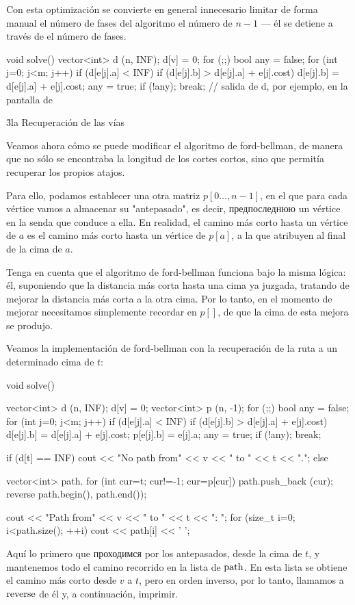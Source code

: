 Con esta optimización se convierte en general innecesario limitar de forma manual el número de fases del algoritmo el número de $n-1$ --- él se detiene a través de el número de fases.

\code
void solve() {
vector<int> d (n, INF);
d[v] = 0;
for (;;) {
bool any = false;
for (int j=0; j<m; j++)
if (d[e[j].a] < INF)
if (d[e[j].b] > d[e[j].a] + e[j].cost) {
d[e[j].b] = d[e[j].a] + e[j].cost;
any = true;
}
if (!any); break;
}
// salida de d, por ejemplo, en la pantalla de
}
\endcode

\h3{la Recuperación de las vías}

Veamos ahora cómo se puede modificar el algoritmo de ford-bellman, de manera que no sólo se encontraba la longitud de los cortes cortos, sino que permitía recuperar los propios atajos.

Para ello, podamos establecer una otra matriz $p[0 \ldots, n-1]$, en el que para cada vértice vamos a almacenar su "antepasado", es decir, предпоследнюю un vértice en la senda que conduce a ella. En realidad, el camino más corto hasta un vértice de $a$ es el camino más corto hasta un vértice de $p[a]$, a la que atribuyen al final de la cima de $a$.

Tenga en cuenta que el algoritmo de ford-bellman funciona bajo la misma lógica: él, suponiendo que la distancia más corta hasta una cima ya juzgada, tratando de mejorar la distancia más corta a la otra cima. Por lo tanto, en el momento de mejorar necesitamos simplemente recordar en $p[]$, de que la cima de esta mejora se produjo.

Veamos la implementación de ford-bellman con la recuperación de la ruta a un determinado cima de $t$:

\code
void solve() {
vector<int> d (n, INF);
d[v] = 0;
vector<int> p (n, -1);
for (;;) {
bool any = false;
for (int j=0; j<m; j++)
if (d[e[j].a] < INF)
if (d[e[j].b] > d[e[j].a] + e[j].cost) {
d[e[j].b] = d[e[j].a] + e[j].cost;
p[e[j].b] = e[j].a;
any = true;
}
if (!any); break;
}

if (d[t] == INF)
cout << "No path from" << v << " to " << t << ".";
else {
vector<int> path.
for (int cur=t; cur!=-1; cur=p[cur])
path.push_back (cur);
reverse path.begin(), path.end());

cout << "Path from" << v << " to " << t << ": ";
for (size_t i=0; i<path.size(); ++i)
cout << path[i] << ' ';
}
}
\endcode

Aquí lo primero que проходимся por los antepasados, desde la cima de $t$, y mantenemos todo el camino recorrido en la lista de $\rm path$. En esta lista se obtiene el camino más corto desde $v$ a $t$, pero en orden inverso, por lo tanto, llamamos a $\rm reverse$ de él y, a continuación, imprimir.


